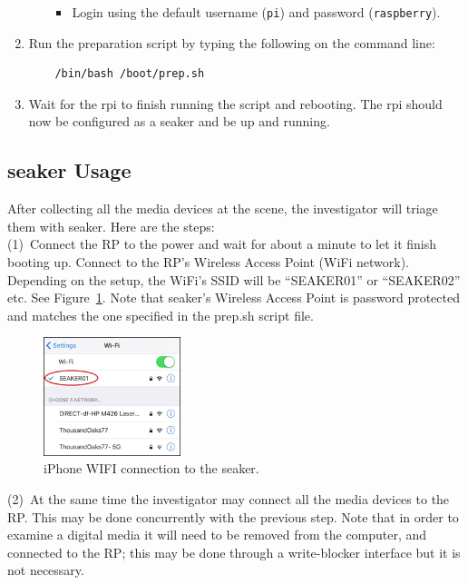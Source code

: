 \documentclass[12pt]{article}
\begin{document}
\begin{enumerate}
\begin{itemize}
\begin{itemize}
        \item Login using the default username (\verb|pi|) and password
        (\verb|raspberry|).
      \end{itemize}
    \end{itemize}
  \item Run the preparation script by typing the following on the command line:
  \begin{verbatim}
    /bin/bash /boot/prep.sh
  \end{verbatim}
  \item Wait for the \gls{rpi} to finish running the script and
  rebooting. The \gls{rpi} should now be configured as a \gls{seaker}
  and be up and running.
\end{enumerate}

\newpage
\subsection{\gls{seaker} Usage}
After collecting all the media devices at the scene, the investigator
will triage them with \gls{seaker}. Here are the steps:\\

(1)~Connect the RP to the power and wait for about a minute
to let it finish booting up.
Connect to the RP's Wireless Access Point (WiFi network). Depending
on the setup, the WiFi's SSID will be ``SEAKER01'' or ``SEAKER02''
etc.  See Figure~\ref{fig:screen-1}. Note that \gls{seaker}'s Wireless Access
Point is password
protected and matches the one specified in the prep.sh script file.\\

\begin{figure}[ht]
  \begin{center}
  \includegraphics[width=4cm]{images/seaker-hh-screen-1.jpg}
  \caption{iPhone WIFI connection to the \gls{seaker}.}\label{fig:screen-1}
  \end{center}
\end{figure}

(2)~At the same time the investigator may connect all the media
devices to the RP. This may be done concurrently with the previous
step. Note that in order to examine a digital media it will need to be
removed from the
computer, and connected to the RP; this may be done through a
write-blocker interface but it is not necessary.\\
\end{document}
